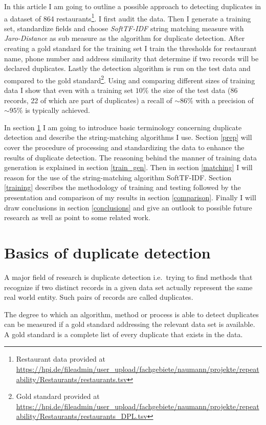 \documentclass[conference]{IEEEtran}
\newcommand{\unsim}{\mathord{\sim}}
\begin{document}
In this article I am going to outline a possible approach to detecting duplicates in a dataset of 864 
restaurants\footnote{Restaurant data provided at \url{https://hpi.de/fileadmin/user_upload/fachgebiete/naumann/projekte/repeatability/Restaurants/restaurants.tsv}}.
I first audit the data. Then  I generate a training set, standardize fields and choose \emph{SoftTF-IDF} string matching measure with \emph{Jaro-Distance} as sub measure as the algorithm for duplicate detection. After creating a gold standard for the training set I train the thresholds for restaurant name, phone number and address similarity that determine if two records will be declared duplicates. Lastly the detection algorithm is run on the test data and compared to the gold 
standard\footnote{Gold standard provided at \url{https://hpi.de/fileadmin/user_upload/fachgebiete/naumann/projekte/repeatability/Restaurants/restaurants_DPL.tsv}}.
Using and comparing different sizes of training data I show that even with a training set $10\%$ the size of the test data (86 records, 22 of which are part of duplicates) a recall of $\unsim86\%$ with a precision of $\unsim95\%$ is typically achieved.

In section \ref{basics} I am going to introduce basic terminology concerning duplicate detection and describe the string-matching algorithms I use. Section \ref{prep} will cover the procedure of processing and standardizing the data to enhance the results of duplicate detection. The reasoning behind the manner of training data generation is explained in section \ref{train_gen}. Then in section \ref{matching} I will reason for the use of the string-matching algorithm SoftTF-IDF. Section \ref{training} describes the methodology of training and testing followed by the presentation and comparison of my results in section \ref{comparison}. Finally I will draw conclusions in section \ref{conclusions} and give an outlook to possible future research as well as point to some related work.
\section{Basics of duplicate detection}\label{basics}
A major field of research is duplicate detection i.e.\ trying to find methods that recognize if two distinct records in a given data set actually represent the same real world entity. Such pairs of records are called duplicates.

The degree to which an algorithm, method or process is able to detect duplicates can be measured if a gold standard addressing the relevant data set is available. A gold standard is a complete list of every duplicate that exists in the data.
\end{document}
